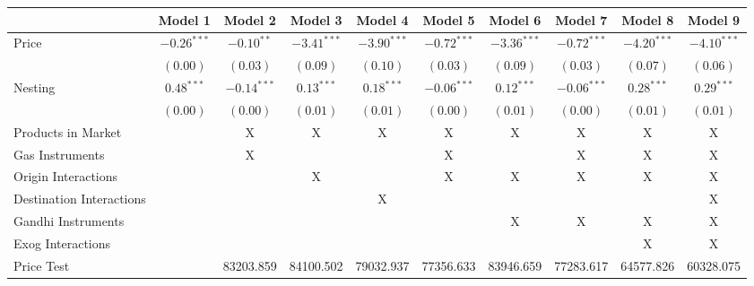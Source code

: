 
\begin{tabular}{l c c c c c c c c c}
\toprule
 & Model 1 & Model 2 & Model 3 & Model 4 & Model 5 & Model 6 & Model 7 & Model 8 & Model 9 \\
\midrule
Price                       & $-0.26^{***}$ & $-0.10^{**}$  & $-3.41^{***}$ & $-3.90^{***}$ & $-0.72^{***}$ & $-3.36^{***}$ & $-0.72^{***}$ & $-4.20^{***}$ & $-4.10^{***}$ \\
                            & $(0.00)$      & $(0.03)$      & $(0.09)$      & $(0.10)$      & $(0.03)$      & $(0.09)$      & $(0.03)$      & $(0.07)$      & $(0.06)$      \\
Nesting                     & $0.48^{***}$  & $-0.14^{***}$ & $0.13^{***}$  & $0.18^{***}$  & $-0.06^{***}$ & $0.12^{***}$  & $-0.06^{***}$ & $0.28^{***}$  & $0.29^{***}$  \\
                            & $(0.00)$      & $(0.00)$      & $(0.01)$      & $(0.01)$      & $(0.00)$      & $(0.01)$      & $(0.00)$      & $(0.01)$      & $(0.01)$      \\
\midrule
Products in Market          &               & X             & X             & X             & X             & X             & X             & X             & X             \\
Gas Instruments             &               & X             &               &               & X             &               & X             & X             & X             \\
Origin Interactions         &               &               & X             &               & X             & X             & X             & X             & X             \\
Destination Interactions    &               &               &               & X             &               &               &               &               & X             \\
Gandhi Instruments          &               &               &               &               &               & X             & X             & X             & X             \\
Exog Interactions           &               &               &               &               &               &               &               & X             & X             \\
Price Test                  &               & 83203.859     & 84100.502     & 79032.937     & 77356.633     & 83946.659     & 77283.617     & 64577.826     & 60328.075     \\

\end{tabular}
